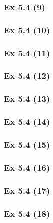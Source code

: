 \subsubsection{Ex 5.4 (9)}\label{sec:Ex_5.4.9}

\subsubsection{Ex 5.4 (10)}\label{sec:Ex_5.4.10}

\newpage		%

\subsubsection{Ex 5.4 (11)}\label{sec:Ex_5.4.11}

\subsubsection{Ex 5.4 (12)}\label{sec:Ex_5.4.12}

\subsubsection{Ex 5.4 (13)}\label{sec:Ex_5.4.13}

\subsubsection{Ex 5.4 (14)}\label{sec:Ex_5.4.14}

\subsubsection{Ex 5.4 (15)}\label{sec:Ex_5.4.15}

\subsubsection{Ex 5.4 (16)}\label{sec:Ex_5.4.16}

\subsubsection{Ex 5.4 (17)}\label{sec:Ex_5.4.17}

\subsubsection{Ex 5.4 (18)}\label{sec:Ex_5.4.18}

